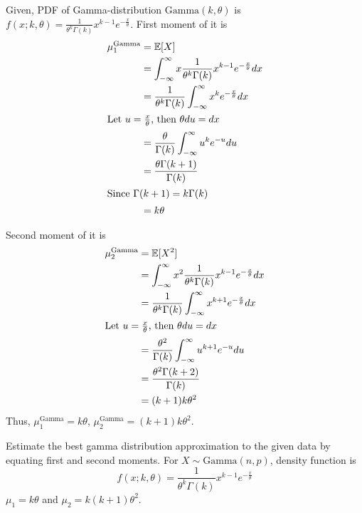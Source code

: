 \begin{solution}
	Given, PDF of Gamma-distribution $\text{Gamma}(k, \theta)$ is $f(x;k,\theta) =
		\frac{1}{\theta^k\Gamma(k)}x^{k-1}e^{-\frac{x}{\theta}}$. First moment
	of it is
	\begin{align}
		\mu_1^\text{Gamma} & = \mathbb{E}[X]                               \\
		                   & = \int_{-\infty}^\infty
		x\frac{1}{\theta^k\Gamma(k)}x^{k-1}e^{-\frac{x}{\theta}}dx
		\\
		                   & =
		\frac{1}{\theta^k\Gamma(k)}\int_{-\infty}^\infty
		x^ke^{-\frac{x}{\theta}}dx                                 \\
		\intertext{Let $u = \frac{x}{\theta}$, then $\theta du = dx$}
		                   & =
		\frac{\theta}{\Gamma(k)}\int_{-\infty}^\infty
		u^k e^{-u} du                                              \\
		                   & = \frac{\theta\Gamma(k+1)}{\Gamma(k)}
		\\
		\intertext{Since $\Gamma(k+1)=k\Gamma(k)$}
		                   & = k\theta
	\end{align}

	Second moment of it is
	\begin{align}
		\mu_2^\text{Gamma} & = \mathbb{E}[X^2]                               \\
		                   & = \int_{-\infty}^\infty
		x^2\frac{1}{\theta^k\Gamma(k)}x^{k-1}e^{-\frac{x}{\theta}}dx
		\\
		                   & =
		\frac{1}{\theta^k\Gamma(k)}\int_{-\infty}^\infty
		x^{k+1}e^{-\frac{x}{\theta}}dx                               \\
		\intertext{Let $u = \frac{x}{\theta}$, then $\theta du = dx$}
		                   & =
		\frac{\theta^2}{\Gamma(k)}\int_{-\infty}^\infty
		u^{k+1}e^{-u} du                                             \\
		                   & = \frac{\theta^2\Gamma(k+2)}{\Gamma(k)}
		\\
		                   & = (k+1)k\theta^2
	\end{align}
	Thus, $\mu_1^\text{Gamma} = k\theta$, $\mu_2^\text{Gamma} = (k+1)k\theta^2$.

	Estimate the best gamma distribution approximation to the given data by equating first and second moments. For $X\sim\text{Gamma}(n,p)$, density function is
	\begin{equation}
		f(x; k, \theta) = \frac{1}{\theta^k\Gamma(k)} x^{k-1} e^{-\frac{x}{\theta}}
	\end{equation}
	$\mu_1 = k\theta$ and $\mu_2 = k(k+1)\theta^2$.


\end{solution}
